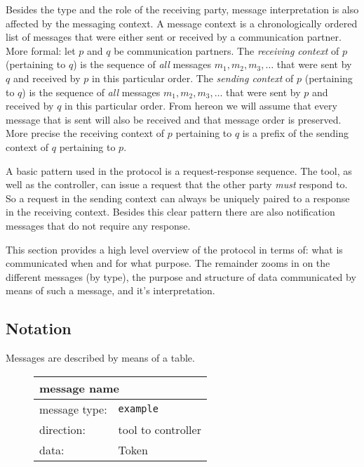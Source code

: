 \documentclass{article}
\newcommand{\msg}[1]{\texttt{#1}}
\begin{document}
  Besides the type and the role of the receiving party, message interpretation
  is also affected by the messaging context. A message context is a chronologically
  ordered list of messages that were either sent or received by a communication
  partner.  More formal: let $p$ and $q$ be communication partners. The
  \textit{receiving context} of $p$ (pertaining to $q$) is the sequence of
  \emph{all} messages $m_{1}, m_{2}, m_{3}, \ldots$ that were sent by $q$ and
  received by $p$ in this particular order.  The \textit{sending context} of
  $p$ (pertaining to $q$) is the sequence of \emph{all} messages $m_{1}, m_{2},
  m_{3}, \ldots$ that were sent by $p$ and received by $q$ in this particular
  order. From hereon we will assume that every message that is sent will also
  be received and that message order is preserved. More precise the receiving
  context of $p$ pertaining to $q$ is a prefix of the sending context of $q$
  pertaining to $p$.

  A basic pattern used in the protocol is a request-response sequence. The
  tool, as well as the controller, can issue a request that the other party
  \emph{must} respond to. So a request in the sending context can always be
  uniquely paired to a response in the receiving context. Besides this clear
  pattern there are also notification messages that do not require any response.

  This section provides a high level overview of the protocol in terms of: what
  is communicated when and for what purpose. The remainder zooms in on the
  different messages (by type), the purpose and structure of data communicated
  by means of such a message, and it's interpretation.

  \subsection{Notation}

   Messages are described by means of a table.
   \begin{figure}[H]
    \begin{center}
     \begin{tabular}{|ll|}
      \hline
       \multicolumn{2}{|l|}{\textbf{message name}} \\
      \hline
       message type:    & \msg{example} \\
      \hline
       direction:       & tool to controller \\
       data:            & Token \\
      \hline
     \end{tabular}
     \vspace{-0.3cm}
    \end{center}
   \end{figure}
\end{document}

